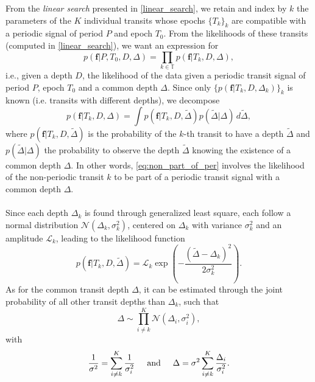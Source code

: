 \documentclass{aastex631}
\begin{document}
\newcommand{\sumTk}{i\neq k}
From the \textit{linear search} presented in \autoref{linear_search}, we retain and index by $k$ the parameters of the $K$ individual transits whose epochs $\{T_k\}_k$ are compatible with a periodic signal of period $P$ and epoch $T_0$. From the likelihoods of these transits (computed in \autoref{linear_search}), we want an expression for
\begin{equation*}
    p(\bm{f} \vert P, T_0 ,D, \Delta) = \prod_{k\in\mathbb{T}} p(\bm{f} \vert T_k, D, \Delta),
\end{equation*}
i.e., given a depth $D$, the likelihood of the data given a periodic transit signal of period $P$, epoch $T_0$ and a common depth $\Delta$. Since only $\{p(\bm{f} \vert T_k, D, \Delta_k)\}_{k}$ is known (i.e. transits with different depths), we decompose
\begin{equation}\label{eq:non_part_of_per}
    p(\bm{f} \vert T_k, D, \Delta) = \int p(\bm{f} \vert T_k, D, \tilde\Delta)p(\tilde\Delta | \Delta)\, d\tilde\Delta,
\end{equation}
where $p(\bm{f} \vert T_k, D, \tilde\Delta)$ is the probability of the $k$-th transit to have a depth $\tilde\Delta$ and $p(\tilde\Delta | \Delta)$ the probability to observe the depth $\tilde\Delta$ knowing the existence of a common depth $\Delta$. In other words, \autoref{eq:non_part_of_per} involves the likelihood of the non-periodic transit $k$ to be part of a periodic transit signal with a common depth $\Delta$.
\\\\
Since each depth $\Delta_k$ is found through generalized least square, each follow a normal distribution $\mathcal{N}(\Delta_k, \sigma_k^2)$, centered on $\Delta_k$ with variance $\sigma_k^2$ and an amplitude $\mathcal{L}_k$, leading to the likelihood function
\begin{equation*}
    p(\bm{f} \vert T_k, D, \tilde\Delta) = \mathcal{L}_k\exp \left(-\frac{(\tilde\Delta-\Delta_k)^2}{2\sigma_k^2}\right).
\end{equation*}
As for the common transit depth $\Delta$, it can be estimated through the joint probability of all other transit depths than $\Delta_k$, such that
\begin{equation*}
    \Delta \sim \prod_{\sumTk}^K \mathcal{N}(\Delta_i, \sigma_i^2),
\end{equation*}
with 
\begin{equation}\label{eq:params}
\frac{1}{\sigma^2} = \sum_{\sumTk}^K \frac{1}{\sigma_i^2} \hspace{0.5cm} \text{and} \hspace{0.5cm}
\Delta =\sigma^2 \sum_{\sumTk}^K {\frac{\Delta_i}{\sigma_i^2}}.
\end{equation}
\end{document}
